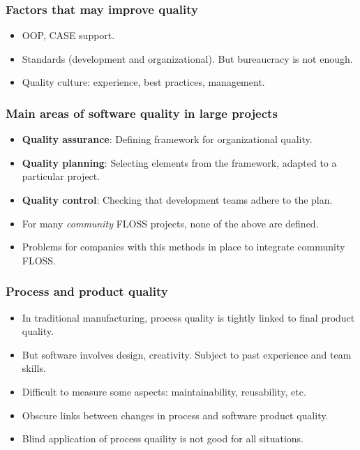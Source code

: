 \documentclass{beamer}
\begin{document}

\begin{frame}
 \frametitle{Factors that may improve quality}
 \begin{itemize}
 \item OOP, CASE support.
 \item Standards (development and organizational). But bureaucracy is not enough.
 \item Quality culture: experience, best practices, management.
 \end{itemize}
\end{frame}


\begin{frame}
 \frametitle{Main areas of software quality in large projects}
 \begin{itemize}
  \item \textbf{Quality assurance}: Defining framework for organizational quality.
  \item \textbf{Quality planning}: Selecting elements from the framework, adapted
  to a particular project.
  \item \textbf{Quality control}: Checking that development teams adhere to the plan.
  \item For many \textit{community} FLOSS projects, none of the above are defined.
  \item Problems for companies with this methods in place to integrate community FLOSS.
 \end{itemize}
\end{frame}


\begin{frame}
 \frametitle{Process and product quality}
 \begin{itemize}
 \item In traditional manufacturing, process quality is tightly linked to final product quality.
 \item But software involves design, creativity. Subject to past experience and team skills.
 \item Difficult to measure some aspects: maintainability, reusability, etc.
 \item Obscure links between changes in process and software product quality.
 \item Blind application of process quaility is not good for all situations.
 \end{itemize}
\end{frame}
\end{document}
